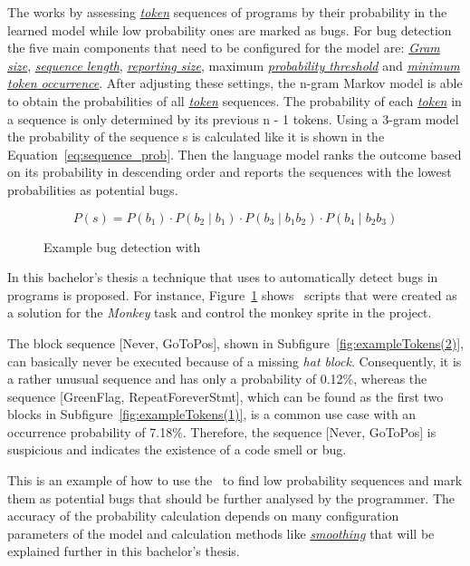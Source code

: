 The \ngram{} works by assessing \hyperref[def:token]{\textit{token}} sequences of programs by their probability in the learned model while low probability ones are marked as bugs. For bug detection the five main components that need to be configured for the model are: \hyperref[def:gram_size]{\textit{Gram size}}, \hyperref[def:sequence_length]{\textit{sequence length}}, \hyperref[def:reporting_size]{\textit{reporting size}}, maximum \hyperref[def:probability_threshold]{\textit{probability threshold}} and \hyperref[def:minimum_token_occurrence]{\textit{minimum token occurrence}}. After adjusting these settings, the n-gram Markov model is able to obtain the probabilities of all \hyperref[def:token]{\textit{token}} sequences. The probability of each \hyperref[def:token]{\textit{token}} in a sequence is only determined by its previous n - 1 tokens. Using a 3-gram model the probability of the sequence s is calculated like it is shown in the Equation~\ref{eq:sequence_prob}. Then the language model ranks the outcome based on its probability in descending order and reports the sequences with the lowest probabilities as potential bugs. 
 
\begin{equation} \label{eq:sequence_prob}
P(s) ={} P(b_{1})\cdot P(b_{2}\mid b_{1})\cdot P(b_{3}\mid b_{1}b_{2})\cdot P(b_{4}\mid b_{2}b_{3})
\end{equation}

\begin{figure}%
    \centering
    \qquad
    \caption[Example bug detection with \ngram{}]{\label{fig:exampleTokens}Example bug detection with \ngram{}}%
\end{figure}

In this bachelor's thesis a technique that uses  to automatically detect bugs in \scratch{} programs is proposed. For instance, Figure~\ref{fig:exampleTokens} shows \scratch\ scripts that were created as a solution for the \textit{Monkey} task and control the monkey sprite in the project. 

The block sequence [Never, GoToPos], shown in Subfigure~\ref{fig:exampleTokens(2)}, can basically never be executed because of a missing \textit{hat block}. Consequently, it is a rather unusual sequence and has only a probability of 0.12\%, whereas the sequence [GreenFlag, RepeatForeverStmt], which can be found as the first two blocks in Subfigure~\ref{fig:exampleTokens(1)}, is a common use case with an occurrence probability of 7.18\%. Therefore, the sequence [Never, GoToPos] is suspicious and indicates the existence of a code smell or bug. 

This is an example of how to use the \ngram\ to find low probability sequences and mark them as potential bugs that should be further analysed by the programmer. The accuracy of the probability calculation depends on many configuration parameters of the model and calculation methods like \hyperref[def:smoothing]{\textit{smoothing}} that will be explained further in this bachelor's thesis. 
